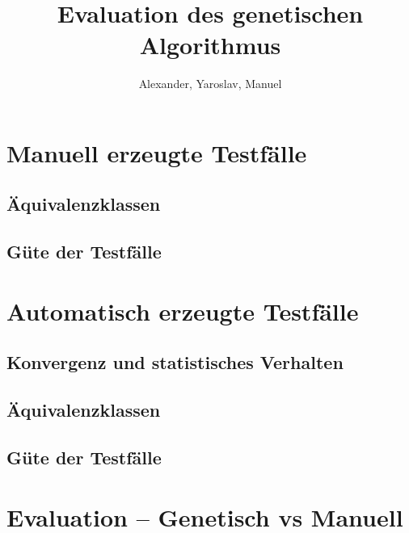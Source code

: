 \documentclass[12pt,a4paper]{scrarticl}
\author{Alexander, Yaroslav, Manuel}
\title{Evaluation des genetischen Algorithmus}
\begin{document}
\maketitle
\tableofcontents
\section{Manuell erzeugte Testfälle}
\subsection{Äquivalenzklassen}
\subsection{Güte der Testfälle}

\section{Automatisch erzeugte Testfälle}
\subsection{Konvergenz und statistisches Verhalten}
\subsection{Äquivalenzklassen}
\subsection{Güte der Testfälle}

\section{Evaluation -- Genetisch vs Manuell}
\end{document}
